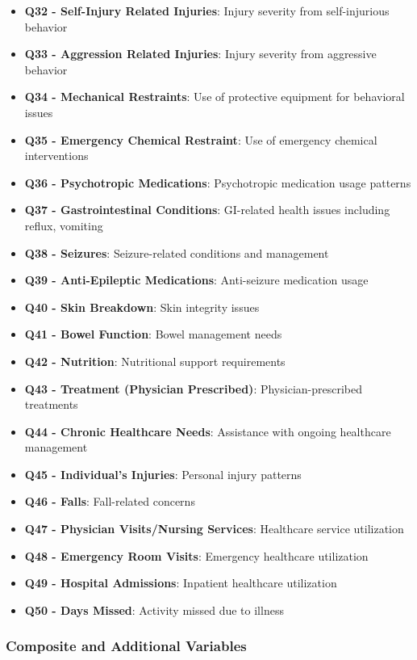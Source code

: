 \documentclass[12pt]{article}
\begin{document}
\begin{itemize}
    \item \textbf{Q32 - Self-Injury Related Injuries}: Injury severity from self-injurious behavior
    \item \textbf{Q33 - Aggression Related Injuries}: Injury severity from aggressive behavior
    \item \textbf{Q34 - Mechanical Restraints}: Use of protective equipment for behavioral issues
    \item \textbf{Q35 - Emergency Chemical Restraint}: Use of emergency chemical interventions
    \item \textbf{Q36 - Psychotropic Medications}: Psychotropic medication usage patterns
    \item \textbf{Q37 - Gastrointestinal Conditions}: GI-related health issues including reflux, vomiting
    \item \textbf{Q38 - Seizures}: Seizure-related conditions and management
    \item \textbf{Q39 - Anti-Epileptic Medications}: Anti-seizure medication usage
    \item \textbf{Q40 - Skin Breakdown}: Skin integrity issues
    \item \textbf{Q41 - Bowel Function}: Bowel management needs
    \item \textbf{Q42 - Nutrition}: Nutritional support requirements
    \item \textbf{Q43 - Treatment (Physician Prescribed)}: Physician-prescribed treatments
    \item \textbf{Q44 - Chronic Healthcare Needs}: Assistance with ongoing healthcare management
    \item \textbf{Q45 - Individual's Injuries}: Personal injury patterns
    \item \textbf{Q46 - Falls}: Fall-related concerns
    \item \textbf{Q47 - Physician Visits/Nursing Services}: Healthcare service utilization
    \item \textbf{Q48 - Emergency Room Visits}: Emergency healthcare utilization
    \item \textbf{Q49 - Hospital Admissions}: Inpatient healthcare utilization
    \item \textbf{Q50 - Days Missed}: Activity missed due to illness
\end{itemize}

\subsubsection{Composite and Additional Variables}
\end{document}
